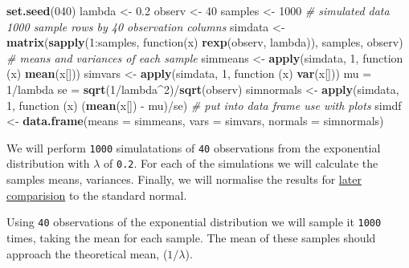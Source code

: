 \documentclass[legalpaper]{article}
\newenvironment{Shaded}{\begin{snugshade}}{\end{snugshade}}
\newcommand{\KeywordTok}[1]{\textcolor[rgb]{0.13,0.29,0.53}{\textbf{{#1}}}}
\newcommand{\DataTypeTok}[1]{\textcolor[rgb]{0.13,0.29,0.53}{{#1}}}
\newcommand{\DecValTok}[1]{\textcolor[rgb]{0.00,0.00,0.81}{{#1}}}
\newcommand{\FloatTok}[1]{\textcolor[rgb]{0.00,0.00,0.81}{{#1}}}
\newcommand{\StringTok}[1]{\textcolor[rgb]{0.31,0.60,0.02}{{#1}}}
\newcommand{\CommentTok}[1]{\textcolor[rgb]{0.56,0.35,0.01}{\textit{{#1}}}}
\newcommand{\NormalTok}[1]{{#1}}
\begin{document}
\begin{Shaded}
\begin{Highlighting}[]
\KeywordTok{set.seed}\NormalTok{(}\DecValTok{040}\NormalTok{)}
\NormalTok{lambda <-}\StringTok{ }\FloatTok{0.2}
\NormalTok{observ <-}\StringTok{ }\DecValTok{40}
\NormalTok{samples <-}\StringTok{ }\DecValTok{1000}
\CommentTok{# simulated data 1000 sample rows by 40 observation columns}
\NormalTok{simdata <-}\StringTok{ }\KeywordTok{matrix}\NormalTok{(}\KeywordTok{sapply}\NormalTok{(}\DecValTok{1}\NormalTok{:samples, function(x) }\KeywordTok{rexp}\NormalTok{(observ, lambda)), samples, observ)}
\CommentTok{# means and variances of each sample}
\NormalTok{simmeans <-}\StringTok{ }\KeywordTok{apply}\NormalTok{(simdata, }\DecValTok{1}\NormalTok{, function (x) }\KeywordTok{mean}\NormalTok{(x[]))}
\NormalTok{simvars <-}\StringTok{ }\KeywordTok{apply}\NormalTok{(simdata, }\DecValTok{1}\NormalTok{, function (x) }\KeywordTok{var}\NormalTok{(x[]))}
\NormalTok{mu =}\StringTok{ }\DecValTok{1}\NormalTok{/lambda}
\NormalTok{se =}\StringTok{ }\KeywordTok{sqrt}\NormalTok{(}\DecValTok{1}\NormalTok{/lambda^}\DecValTok{2}\NormalTok{)/}\KeywordTok{sqrt}\NormalTok{(observ)}
\NormalTok{simnormals <-}\StringTok{ }\KeywordTok{apply}\NormalTok{(simdata, }\DecValTok{1}\NormalTok{, function (x) (}\KeywordTok{mean}\NormalTok{(x[]) -}\StringTok{ }\NormalTok{mu)/se)}
\CommentTok{# put into data frame use with plots}
\NormalTok{simdf <-}\StringTok{ }\KeywordTok{data.frame}\NormalTok{(}\DataTypeTok{means =} \NormalTok{simmeans, }\DataTypeTok{vars =} \NormalTok{simvars, }\DataTypeTok{normals =} \NormalTok{simnormals)}
\end{Highlighting}
\end{Shaded}

We will perform \texttt{1000} simulatations of \texttt{40} observations
from the exponential distribution with \(\lambda\) of \texttt{0.2}. For
each of the simulations we will calculate the samples means, variances.
Finally, we will normalise the results for
\hyperref[distribution-is-approximately-normal]{later comparision} to
the standard normal.


Using \texttt{40} observations of the exponential distribution we will
sample it \texttt{1000} times, taking the mean for each sample. The mean
of these samples should approach the theoretical mean, (\(1/\lambda\)).
\end{document}

